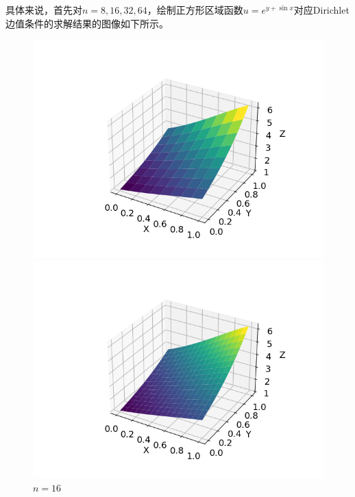 \documentclass{ctexart}
\begin{document}
\begin{sloppypar}
具体来说，首先对$n=8,16,32,64$，绘制正方形区域函数$u = e^{y+\sin x}$对应Dirichlet边值条件的求解结果的图像如下所示。
\begin{figure}[H]
  \begin{minipage}[t]{0.5\linewidth}
    \centering
    \includegraphics[scale = 0.5]{f1_D_8.png}
    \caption{$n = 8$}
  \end{minipage}
  \begin{minipage}[t]{0.5\linewidth}
    \centering
    \includegraphics[scale = 0.5]{f1_D_16.png}
    \caption{$n = 16$}
  \end{minipage}
  \label{fig2}
\end{figure}


\end{sloppypar}
\end{document}
